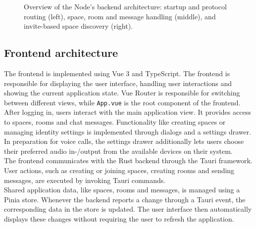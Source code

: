 \documentclass{article} %
\begin{document}
\begin{figure}[H]
\caption{Overview of the Node's backend architecture: startup and protocol routing (left), space, room and message handling (middle), and invite-based space discovery (right).}
\label{fig:node_architecture}
\end{figure}

\subsection{Frontend architecture}
The frontend is implemented using Vue 3 and TypeScript. The frontend is responsible for displaying the user interface, handling user interactions and showing the current application state. Vue Router is responsible for switching between different views, while \texttt{App.vue} is the root component of the frontend.
\\
After logging in, users interact with the main application view. It provides access to spaces, rooms and chat messages. Functionality like creating spaces or managing identity settings is implemented through dialogs and a settings drawer. In preparation for voice calls, the settings drawer additionally lets users choose their preferred audio in-/output from the available devices on their system.
\\
The frontend communicates with the Rust backend through the Tauri framework. User actions, such as creating or joining spaces, creating rooms and sending messages, are executed by invoking Tauri commands.
\\
Shared application data, like spaces, rooms and messages, is managed using a Pinia store. Whenever the backend reports a change through a Tauri event, the corresponding data in the store is updated. The user interface then automatically displays these changes without requiring the user to refresh the application.
\\
\end{document}
